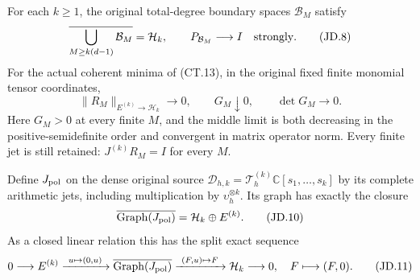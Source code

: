 \begin{theorem}
For each \(k\ge1\), the original total-degree boundary spaces
\(\mathcal B_M\) satisfy
\[
 \overline{\bigcup_{M\ge k(d-1)}\mathcal B_M}=\mathcal H_k,
 \qquad P_{\mathcal B_M}\longrightarrow I\quad\hbox{strongly}.
 \tag{JD.8}
\]
For the actual coherent minima of (CT.13), in the original fixed
finite monomial tensor coordinates,
\[
 \|R_M\|_{E^{(k)}\to\mathcal H_k}\longrightarrow0,
 \qquad G_M\downarrow0,
 \qquad \det G_M\longrightarrow0.
 \tag{JD.9}
\]
Here \(G_M>0\) at every finite \(M\), and the middle limit
is both decreasing in the positive-semidefinite order and convergent
in matrix operator norm.  Every finite jet is still retained:
\(J^{(k)}R_M=I\) for every \(M\).

Define \(J_{\rm pol}\) on the dense original source
\(\mathcal D_{h,k}=\mathcal T_h^{(k)}\mathbb C[s_1,\ldots,s_k]\)
by its complete arithmetic jets, including multiplication by
\(\upsilon_h^{\otimes k}\).  Its graph has exactly the closure
\[
 \overline{\operatorname{Graph}(J_{\rm pol})}
       =\mathcal H_k\oplus E^{(k)}.
 \tag{JD.10}
\]
As a closed linear relation this has the split exact sequence
\[
 0\longrightarrow E^{(k)}
   \xrightarrow{\ u\mapsto(0,u)\ }
 \overline{\operatorname{Graph}(J_{\rm pol})}
   \xrightarrow{\ (F,u)\mapsto F\ }\mathcal H_k
   \longrightarrow0,
 \quad F\longmapsto(F,0).
 \tag{JD.11}
\]
\end{theorem}
